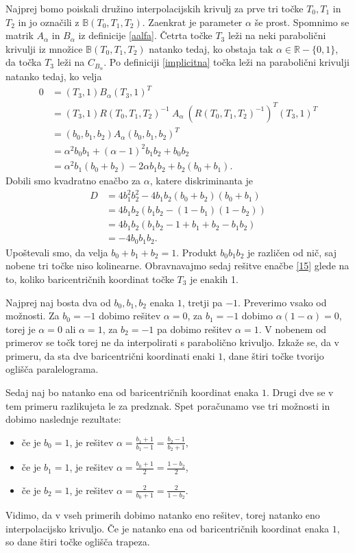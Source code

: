 \documentclass[mat1]{fmfdelo}
\newcommand{\R}{\mathbb R}
\newcommand{\B}{\mathbb B}
\newcommand{\al}{\alpha}
\begin{document}
\begin{dokaz}
Najprej bomo poiskali družino interpolacijskih krivulj za prve tri točke $T_0, T_1$ in $T_2$ in jo označili z  $\B(T_0, T_1, T_2)$. Zaenkrat je parameter $\al$ še prost. Spomnimo se matrik $A_\al$ in $B_\al$ iz definicije \ref{aalfa}. Četrta točke $T_3$ leži na neki parabolični krivulji iz množice $\B(T_0, T_1, T_2)$ natanko tedaj, ko obstaja tak $\al \in \R - \{0,1 \}$, da točka $T_3$ leži na $C_{B_\al}$. Po definiciji \ref{implicitna} točka leži na parabolični krivulji natanko tedaj, ko velja
%
\begin{align}
0	&= (T_3, 1) B_\al (T_3, 1)^T \nonumber \\
	&= (T_3, 1) R(T_0, T_1, T_2)^{-1}\  A_{\al} \  (R(T_0, T_1, T_2)^{-1})^T (T_3, 1)^T \nonumber \\
	&= (b_0, b_1, b_2) A_\al (b_0, b_1, b_2)^T \nonumber \\
	&= \al^2 b_0 b_1 + (\al - 1)^2 b_1 b_2 + b_0 b_2 \label{14} \\ %
	&= \al^2 b_1(b_0 + b_2) - 2 \al b_1 b_2 + b_2(b_0 + b_1). \label{15}
\end{align}
Dobili smo kvadratno enačbo za $\al$, katere diskriminanta je 
\begin{align*}
D	&= 4 b_1^2 b_2^2 - 4 b_1 b_2(b_0 + b_2)(b_0 + b_1)  \\
	&= 4 b_1 b_2(b_1 b_2 - (1 - b_1)(1 - b_2))  \\
	&= 4 b_1 b_2(b_1 b_2 - 1 + b_1 + b_2 - b_1 b_2)  \\
	&= - 4 b_0 b_1 b_2. 
\end{align*}
Upoštevali smo, da velja $ b_0 + b_1 + b_2 = 1$. Produkt $b_0 b_1 b_2$ je različen od nič, saj nobene tri točke niso kolinearne. Obravnavajmo sedaj rešitve enačbe \eqref{15} glede na to, koliko baricentričnih koordinat točke $T_3$ je enakih 1.

Najprej naj bosta dva od $b_0, b_1, b_2$ enaka $1$, tretji pa $-1$. Preverimo vsako od možnosti. Za $b_0 = -1$ dobimo rešitev $\al = 0$, za $b_1 = -1$ dobimo $\al(1 - \al) = 0$, torej je $\al = 0$ ali $\al = 1$, za $b_2 = -1$ pa dobimo rešitev $\al = 1$. V nobenem od primerov se točk torej ne da interpolirati s parabolično krivuljo. Izkaže se, da v primeru, da sta dve baricentrični koordinati enaki $1$, dane štiri točke tvorijo oglišča paralelograma.

Sedaj naj bo natanko ena od baricentričnih koordinat enaka $1$. Drugi dve se v tem primeru razlikujeta le za predznak. Spet poračunamo vse tri možnosti in dobimo naslednje rezultate:
\begin{itemize}
\item če je $b_0 = 1$, je rešitev $\al = \frac{b_1 + 1}{b_1 - 1} = \frac{b_2 - 1}{b_2 + 1}$,
\item če je $b_1 = 1$, je rešitev $\al = \frac{b_0 + 1}{2} = \frac{1 - b_2}{2}$,
\item če je $b_2 = 1$, je rešitev $\al = \frac{2}{b_0 + 1} = \frac{2}{1 - b_2}$.
\end{itemize}
Vidimo, da v vseh primerih dobimo natanko eno rešitev, torej natanko eno interpolacijsko krivuljo. Če je natanko ena od baricentričnih koordinat enaka $1$, so dane štiri točke oglišča trapeza.


\end{dokaz}
\end{document}
